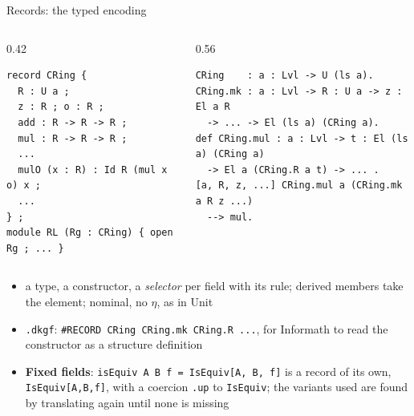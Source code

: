 \documentclass[10pt,aspectratio=169]{beamer}
\newcommand{\file}[1]{\texttt{#1}}
\begin{document}
\begin{frame}[fragile]{Records: the typed encoding}

\begin{columns}[T]
\begin{column}{0.42\textwidth}
\begin{lstlisting}[backgroundcolor=\color{unitbg}]
record CRing {
  R : U a ;
  z : R ; o : R ;
  add : R -> R -> R ;
  mul : R -> R -> R ;
  ...
  mulO (x : R) : Id R (mul x o) x ;
  ...
} ;
module RL (Rg : CRing) { open Rg ; ... }
\end{lstlisting}
\end{column}
\begin{column}{0.56\textwidth}
\begin{lstlisting}
CRing    : a : Lvl -> U (ls a).
CRing.mk : a : Lvl -> R : U a -> z : El a R
  -> ... -> El (ls a) (CRing a).
def CRing.mul : a : Lvl -> t : El (ls a) (CRing a)
  -> El a (CRing.R a t) -> ... .
[a, R, z, ...] CRing.mul a (CRing.mk a R z ...)
  --> mul.
\end{lstlisting}
\end{column}
\end{columns}

\vspace{2mm}
\small
\begin{itemize}
\item a type, a constructor, a \emph{selector} per field with its rule;
  derived members take the element; nominal, no $\eta$, as in Unit
\item \file{.dkgf}: \texttt{\#RECORD CRing CRing.mk CRing.R ...}, for
  Informath to read the constructor as a structure definition
\item \textbf{Fixed fields}: \texttt{isEquiv A B f = IsEquiv[A, B, f]} is
  a record of its own, \texttt{IsEquiv[A,B,f]}, with a coercion
  \texttt{.up} to \texttt{IsEquiv}; the variants used are found by
  translating again until none is missing
\end{itemize}

\end{frame}
\end{document}
